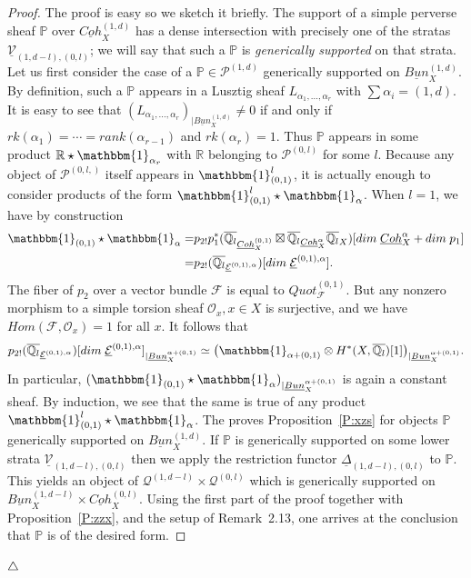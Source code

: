 \documentclass[a4paper,10pt]{amsart}
\def\endexample{$\hfill \triangle$}
\def\endexample{$\hfill \triangle$}
\def\a{\alpha}
\def\qlb{\overline{\mathbb{Q}_l}}
\numberwithin{equation}{section}
\begin{document}
\begin{proof} The proof is easy so we sketch it briefly. The support of a simple perverse sheaf $\mathbb{P}$ over $\underline{Coh}_X^{(1,d)}$ has a dense intersection with precisely one of the stratas $\underline{\mathcal{V}}_{(1,d-l),(0,l)}$; we will say that such a $\mathbb{P}$ is \textit{generically supported} on that strata. Let us first consider the case of a $\mathbb{P} \in \mathcal{P}^{(1,d)}$ generically supported on $\underline{Bun}_X^{(1,d)}$. By definition, such a $\mathbb{P}$ appears in a Lusztig sheaf $L_{\a_1, \ldots, \a_r}$ with $\sum \a_i=(1,d)$. It is easy to see that $(L_{\a_1, \ldots, \a_r})_{|\underline{Bun}_X^{(1,d)}} \neq 0$ if and only if $rk(\a_1)=\cdots =rank(\a_{r-1})$ and $rk(\a_r)=1$. Thus $\mathbb{P}$ appears in some product $\mathbb{R} \star \mathbbm{1}_{\a_r}$ with $\mathbb{R}$ belonging to $\mathcal{P}^{(0,l)}$ for some $l$. Because any object of $\mathcal{P}^{(0,l,)}$ itself appears in $\mathbbm{1}_{(0,1)}^l$, it is actually enough to consider products of the form $\mathbbm{1}_{(0,1)}^l \star \mathbbm{1}_{\a}$. When $l=1$, we have by construction
\begin{equation*}
\begin{split}
\mathbbm{1}_{(0,1)} \star \mathbbm{1}_{\a}=& p_{2!}p_1^*(\qlb_{\underline{Coh}^{(0,1)}_X}\boxtimes \qlb_{\underline{Coh}^{\a}_X} \qlb_{X})[dim\;  \underline{Coh}^{\a}_X+dim\;p_1]\\
=&p_{2!}(\qlb_{\underline{\mathcal{E}}^{(0,1),\a}})[dim\;\underline{\mathcal{E}}^{(0,1),\a}].
\end{split}
\end{equation*}
The fiber of $p_2$ over a vector bundle $\mathcal{F}$ is equal to $Quot^{(0,1)}_{\mathcal{F}}$. But  any nonzero morphism to a simple torsion sheaf $\mathcal{O}_x, x \in X$ is surjective, and we have $Hom(\mathcal{F},\mathcal{O}_x)=1$ for all $x$. It follows that
$$p_{2!}(\qlb_{\underline{\mathcal{E}}^{(0,1),\a}})[dim\;\underline{\mathcal{E}}^{(0,1),\a}]_{|\underline{Bun}^{\a+(0,1)}_X} \simeq \big( \mathbbm{1}_{\a+(0,1)} \otimes H^*(X,\qlb)[1]\big)_{|\underline{Bun}_X^{\a+(0,1)}}.$$
In particular, $(\mathbbm{1}_{(0,1)} \star \mathbbm{1}_{\a})_{|\underline{Bun}^{\a+(0,1)}_X}$ is again a constant sheaf. By induction, we see that the same is true of any product $\mathbbm{1}_{(0,1)}^l \star \mathbbm{1}_{\a}$. The proves Proposition~\ref{P:xzs} for objects $\mathbb{P}$ generically supported on $\underline{Bun}_X^{(1,d)}$. If $\mathbb{P}$ is generically supported on some lower strata 
$\underline{\mathcal{V}}_{(1,d-l),(0,l)}$ then we apply the restriction functor $\underline{\Delta}_{(1,d-l),(0,l)}$ to $\mathbb{P}$. This yields an object of $\mathcal{Q}^{(1,d-l)}\times \mathcal{Q}^{(0,l)}$ which is generically supported on $\underline{Bun}^{(1,d-l)}_X \times \underline{Coh}^{(0,l)}_X$. Using the first part of the proof together with Proposition~\ref{P:zzx}, and the setup of Remark~2.13, one arrives at the conclusion that $\mathbb{P}$ is of the desired form.
\end{proof}
\endexample
\end{document}
